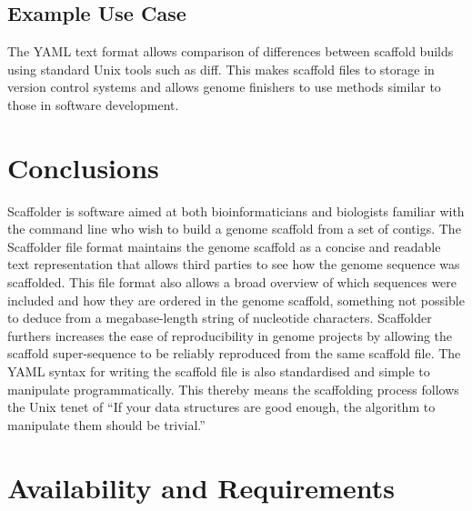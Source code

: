 \documentclass[10pt]{bmc_article}
\newenvironment{bmcformat}{\begin{raggedright}\baselineskip20pt\sloppy\setboolean{publ}{false}}{\end{raggedright}\baselineskip20pt\sloppy}
\begin{document}
\begin{bmcformat}
\subsection*{Example Use Case}

 \pb

The YAML text format  allows comparison of differences between
scaffold builds using standard Unix tools such as diff. This 
makes scaffold files  to storage in version control systems and
allows genome finishers to use methods similar to those in software
development. \pb 

\clearpage

\section*{Conclusions} %

Scaffolder is software aimed at both bioinformaticians and biologists familiar
with the command line who wish to build a genome scaffold from a set of
contigs. The Scaffolder file format maintains the genome scaffold as a concise
and readable text representation that allows third parties to see how the
genome sequence was scaffolded. This file format also allows a broad overview
of which sequences were included and how they are ordered in the genome
scaffold, something not possible to deduce from a megabase-length string of
nucleotide characters. Scaffolder furthers increases the ease of
reproducibility in genome projects by allowing the scaffold super-sequence to
be reliably reproduced from the same scaffold file. The YAML syntax for
writing the scaffold file is also standardised and simple to manipulate
programmatically. This thereby means the scaffolding process follows the Unix
tenet of ``If your data structures are good enough, the algorithm to
manipulate them should be trivial.''

\clearpage

\section*{Availability and Requirements} %


\end{bmcformat}
\end{document}
